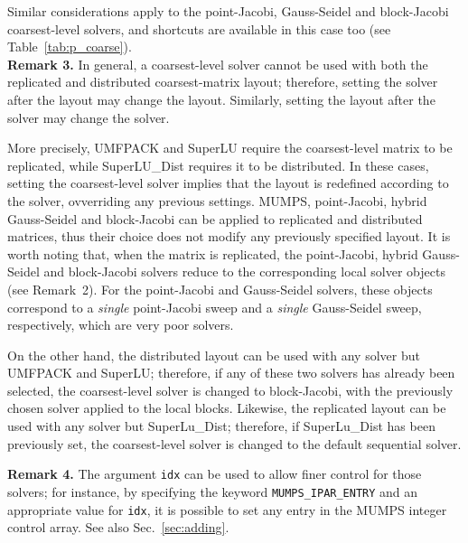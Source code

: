 Similar considerations apply to the point-Jacobi, Gauss-Seidel and block-Jacobi
coarsest-level solvers, and shortcuts are available
in this case too (see Table~\ref{tab:p_coarse}). \\

\textbf{Remark 3.} In general, a coarsest-level solver cannot be used with
both the replicated and distributed coarsest-matrix layout;
therefore, setting the solver after the layout may change the layout.
Similarly, setting the layout after the solver may change the solver.

More precisely, UMFPACK and SuperLU require the coarsest-level
matrix to be replicated, while SuperLU\_Dist requires it to be distributed.
In these cases, setting the coarsest-level solver implies that
the layout is redefined according to the solver, ovverriding any
previous settings. MUMPS,  point-Jacobi,
hybrid Gauss-Seidel and block-Jacobi can be applied to
replicated and distributed matrices, thus their choice
does not modify any previously specified layout.
It is worth noting that, when the matrix is replicated,
the point-Jacobi, hybrid Gauss-Seidel and block-Jacobi solvers
reduce to the corresponding local solver objects (see Remark~2).
For the point-Jacobi and Gauss-Seidel solvers, these objects
correspond to a \emph{single} point-Jacobi sweep and a \emph{single}
Gauss-Seidel sweep, respectively, which are very poor solvers.

On the other hand, the distributed layout can be used with any solver
but UMFPACK and SuperLU; therefore, if any of these two solvers has already
been selected, the coarsest-level solver is changed to block-Jacobi,
with the previously chosen solver applied to the local blocks.
Likewise, the replicated layout can be used with any solver but SuperLu\_Dist;
therefore, if SuperLu\_Dist has been previously set, the coarsest-level
solver is changed to the default sequential solver.

\textbf{Remark 4.}  The argument \verb|idx| can be used to allow finer
control for those solvers; for instance, by specifying the keyword
\verb|MUMPS_IPAR_ENTRY| and an appropriate value for \verb|idx|, it is
possible to set any entry in the MUMPS integer control array.
See also Sec.~\ref{sec:adding}.


